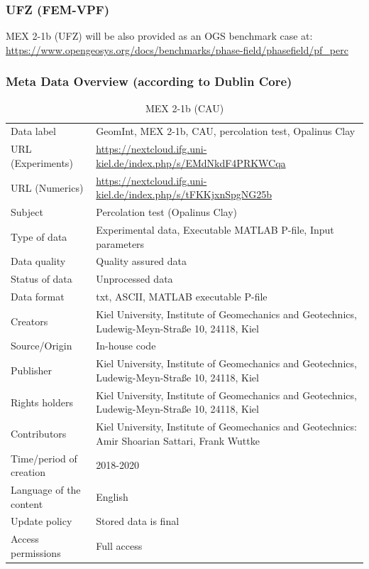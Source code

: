 \subsubsection*{UFZ (FEM-VPF)}

MEX 2-1b (UFZ) will be also provided as an OGS benchmark case at:\\
\small
\url{https://www.opengeosys.org/docs/benchmarks/phase-field/phasefield/pf_perc}
\normalsize

\subsubsection*{Meta Data Overview (according to Dublin Core)}

\begin{table}[!ht]
\caption{MEX 2-1b (CAU)}
\label{tab:dms-mex2-1b}
\small
\begin{tabular}{R{3.5cm}|L{7.5cm}}
\hline
%
Data label & GeomInt, MEX 2-1b, CAU, percolation test, Opalinus Clay \\
URL (Experiments) & \url{https://nextcloud.ifg.uni-kiel.de/index.php/s/EMdNkdF4PRKWCqa} \\
URL (Numerics) & \url{https://nextcloud.ifg.uni-kiel.de/index.php/s/tFKKjxnSpgNG25b}  \\
Subject  &  Percolation test (Opalinus Clay)\\
Type of data  & Experimental data, Executable MATLAB P-file, Input parameters\\
Data quality  &  Quality assured data \\
Status of data  &  Unprocessed data\\
Data format  & txt, ASCII, MATLAB executable P-file\\
Creators  &  Kiel University, Institute of Geomechanics and Geotechnics, Ludewig-Meyn-Stra\ss e 10, 24118, Kiel\\
Source/Origin & In-house code \\
Publisher  &  Kiel University, Institute of Geomechanics and Geotechnics, Ludewig-Meyn-Stra\ss e 10, 24118, Kiel \\
Rights holders &  Kiel University, Institute of Geomechanics and Geotechnics, Ludewig-Meyn-Stra\ss e 10, 24118, Kiel \\
Contributors &   Kiel University, Institute of Geomechanics and Geotechnics: Amir Shoarian Sattari, Frank Wuttke\\
Time/period of creation &  2018-2020\\
Language of the content &  English\\
Update policy &  Stored data is final\\
Access permissions & Full access\\
%
\hline
\end{tabular}
\end{table}

